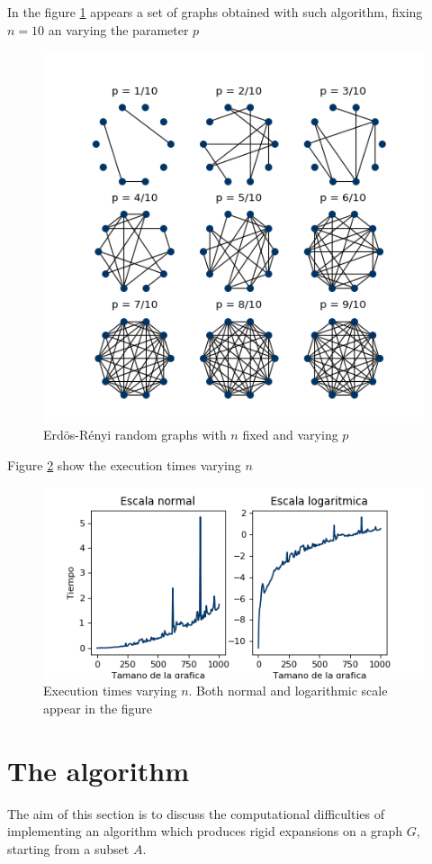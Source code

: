 In the figure \ref{fig:ErdosRenyi10} appears a set of graphs obtained with such algorithm, fixing $n=10$ an varying the parameter $p$
\begin{figure}[h!]
	\centering
	\includegraphics[scale=1]{Figures/ER-10.png}
	\caption{Erdös-Rényi random graphs with $n$ fixed and varying $p$}
	\label{fig:ErdosRenyi10}
\end{figure}

Figure \ref{fig:tiemposER} show the execution times varying $n$
\begin{figure}[h!]
	\centering
	\includegraphics[scale=0.8]{Python/Figures/Times-ER.png}
	\caption{Execution times varying $n$. Both normal and logarithmic scale appear in the figure}
	\label{fig:tiemposER}
\end{figure}

\section{The algorithm}
The aim of this section is to discuss the computational difficulties of implementing an algorithm which produces rigid expansions on a graph $G$, starting from a subset $A$.

